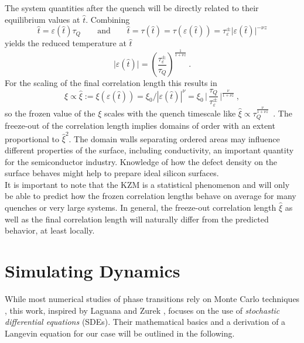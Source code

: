 	The system quantities after the quench will be directly related to their equilibrium values at $\hat{t}$. Combining
	\begin{equation}
		\hat{t} =	\varepsilon(\hat{t}) \tau_Q \qquad \text{and} \qquad  \hat{t} =	\tau(\hat{t}) = \tau(\varepsilon(\hat{t})) =	\tau_\varepsilon^\pm \big | \varepsilon(\hat{t}) \big |^{-\nu z}
	\end{equation}
	yields the reduced temperature at $\hat{t}$
	\begin{equation}
		\big|\varepsilon (\hat{t}) \big| =	\left(\frac{\tau_\varepsilon^\pm}{\tau_Q} \right)^{\frac{1}{1 + \nu z}} ~.
	\end{equation}
	For the scaling of the final correlation length this results in
	\begin{equation} \label{Eq::KZM-scaling}
		\xi \propto \hat{\xi} := \xi(\varepsilon(\hat{t})) =	\xi_0 / |\varepsilon(\hat{t})|^{\nu} =	\xi_0\, \bigg|\, \frac{\tau_Q}{\tau_\varepsilon^\pm}\, \bigg|^{\frac{\nu}{1 + \nu z}} ~,
	\end{equation}
	so the frozen value of the $\xi$ scales with the quench timescale like $\hat{\xi} \propto \tau_Q^{\frac{\nu}{1 + \nu z}}$~.
	The freeze-out of the correlation length implies domains of order with an extent proportional to $\hat{\xi}^2$. The domain walls separating ordered areas may influence different properties of the surface, including conductivity, an important quantity for the semiconductor industry. Knowledge of how the defect density on the surface behaves might help to prepare ideal silicon surfaces. \\
	
	It is important to note that the KZM is a statistical phenomenon and will only be able to predict how the frozen correlation lengths behave on average for many quenches or very large systems. In general, the freeze-out correlation length $\hat{\xi}$ as well as the final correlation length will naturally differ from the predicted behavior, at least locally.
	\chapter{Simulating Dynamics} \label{Chapter::Simulating-Dynamics}
	While most numerical studies of phase transitions rely on Monte Carlo techniques \cite{rastelli2004monte, ferrenberg1991critical, hasenbusch2005two}, this work, inspired by Laguana and Zurek \cite{laguna1997density}, focuses on the use of \textit{stochastic differential equations} (SDEs). Their mathematical basics and a derivation of a Langevin equation for our case  will be outlined in the following.
